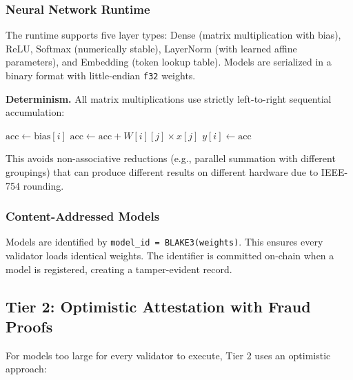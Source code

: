 \documentclass[conference]{IEEEtran}
\begin{document}
\subsubsection{Neural Network Runtime}

The runtime supports five layer types: Dense (matrix multiplication with bias), ReLU, Softmax (numerically stable), LayerNorm (with learned affine parameters), and Embedding (token lookup table). Models are serialized in a binary format with little-endian \texttt{f32} weights.

\textbf{Determinism.} All matrix multiplications use strictly left-to-right sequential accumulation:

\begin{algorithmic}[1]
    \STATE $\text{acc} \leftarrow \text{bias}[i]$
        \STATE $\text{acc} \leftarrow \text{acc} + W[i][j] \times x[j]$
    \ENDFOR
    \STATE $y[i] \leftarrow \text{acc}$
\ENDFOR
\end{algorithmic}

This avoids non-associative reductions (e.g., parallel summation with different groupings) that can produce different results on different hardware due to IEEE-754 rounding.

\subsubsection{Content-Addressed Models}

Models are identified by \texttt{model\_id = BLAKE3(weights)}. This ensures every validator loads identical weights. The identifier is committed on-chain when a model is registered, creating a tamper-evident record.

\subsection{Tier 2: Optimistic Attestation with Fraud Proofs}

For models too large for every validator to execute, Tier 2 uses an optimistic approach:
\end{document}
